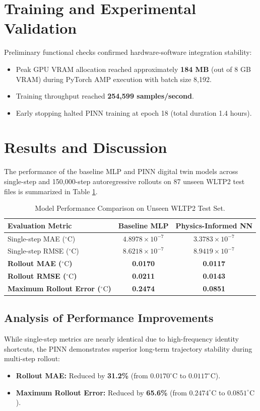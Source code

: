 \documentclass[12pt,a4paper]{article}
\begin{document}
\section{Training and Experimental Validation}
Preliminary functional checks confirmed hardware-software integration stability:
\begin{itemize}
    \item Peak GPU VRAM allocation reached approximately \textbf{184 MB} (out of 8 GB VRAM) during PyTorch AMP execution with batch size 8,192.
    \item Training throughput reached \textbf{254,599 samples/second}.
    \item Early stopping halted PINN training at epoch 18 (total duration 1.4 hours).
\end{itemize}

\section{Results and Discussion}
The performance of the baseline MLP and PINN digital twin models across single-step and 150,000-step autoregressive rollouts on 87 unseen WLTP2 test files is summarized in Table \ref{tab:results}.

\begin{table}[h]
\centering
\caption{Model Performance Comparison on Unseen WLTP2 Test Set.}
\label{tab:results}
\begin{tabularx}{\textwidth}{@{}X c c@{}}
\toprule
Evaluation Metric & Baseline MLP & Physics-Informed NN \\
\midrule
Single-step MAE ($^\circ\text{C}$) & $4.8978 \times 10^{-7}$ & $3.3783 \times 10^{-7}$ \\
Single-step RMSE ($^\circ\text{C}$) & $8.6218 \times 10^{-7}$ & $8.9419 \times 10^{-7}$ \\
\textbf{Rollout MAE ($^\circ\text{C}$)} & \textbf{0.0170} & \textbf{0.0117} \\
\textbf{Rollout RMSE ($^\circ\text{C}$)} & \textbf{0.0211} & \textbf{0.0143} \\
\textbf{Maximum Rollout Error ($^\circ\text{C}$)} & \textbf{0.2474} & \textbf{0.0851} \\
\bottomrule
\end{tabularx}
\end{table}

\subsection{Analysis of Performance Improvements}
While single-step metrics are nearly identical due to high-frequency identity shortcuts, the PINN demonstrates superior long-term trajectory stability during multi-step rollout:
\begin{itemize}
    \item \textbf{Rollout MAE:} Reduced by \textbf{31.2\%} (from $0.0170^\circ\text{C}$ to $0.0117^\circ\text{C}$).
    \item \textbf{Maximum Rollout Error:} Reduced by \textbf{65.6\%} (from $0.2474^\circ\text{C}$ to $0.0851^\circ\text{C}$).
\end{itemize}
\end{document}
